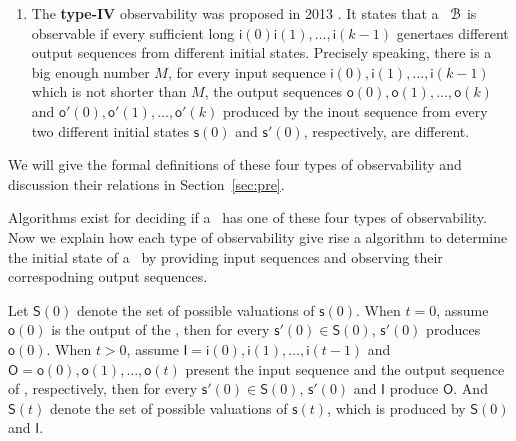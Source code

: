\begin{enumerate}
\item  The  {\bf type-IV}  observability was  proposed in 2013 \cite{Fornasini2013Observability}. It states that a \BCN\ ${\mathcal{B}}$ is observable if every sufficient long $\mathsf{i}(0)\mathsf{i}(1),\ldots,\mathsf{i}(k-1)$ genertaes different output sequences  from different initial states. Precisely speaking, there is a big enough number $M$, for every  input sequence $\mathsf{i}(0),\mathsf{i}(1),\ldots, \mathsf{i}(k-1)$ which is not shorter than $M$, the output sequences $\mathsf{o}(0), \mathsf{o}(1), \ldots, \mathsf{o}(k)$ and  $\mathsf{o}'(0), \mathsf{o}'(1), \ldots, \mathsf{o}'(k)$ produced by the inout sequence from every two different initial states $\mathsf{s}(0)$ and $\mathsf{s}'(0)$, respectively, are different.
\end{enumerate}
 We will give the formal definitions of these four types of observability and discussion their relations in Section~\ref{sec:pre}.

Algorithms exist for deciding if a \BCN\ has one of these four types of observability. Now we explain how each type of observability give rise a algorithm to determine the initial state of a \BCN\ by providing input sequences and observing their correspodning output sequences.

Let $\mathsf{S}(0)$ denote the set of possible valuations of $\mathsf{s}(0)$. When $t=0$, assume $\mathsf{o}(0)$ is the output of the \BCN, then for every $\mathsf{s}'(0)\in\mathsf{S}(0)$, $\mathsf{s}'(0)$ produces $\mathsf{o}(0)$. When $t>0$, assume $\mathsf{I}=\mathsf{i}(0),\mathsf{i}(1),\ldots,\mathsf{i}(t-1)$ and $\mathsf{O}=\mathsf{o}(0),\mathsf{o}(1),\ldots,\mathsf{o}(t)$ present the input sequence and the output sequence of \BCN, respectively, then for every $\mathsf{s}'(0)\in\mathsf{S}(0)$, $\mathsf{s}'(0)$ and $\mathsf{I}$  produce  $\mathsf{O}$. And $\mathsf{S}(t)$ denote the set of possible valuations of $\mathsf{s}(t)$, which is produced by $\mathsf{S}(0)$ and $\mathsf{I}$.

